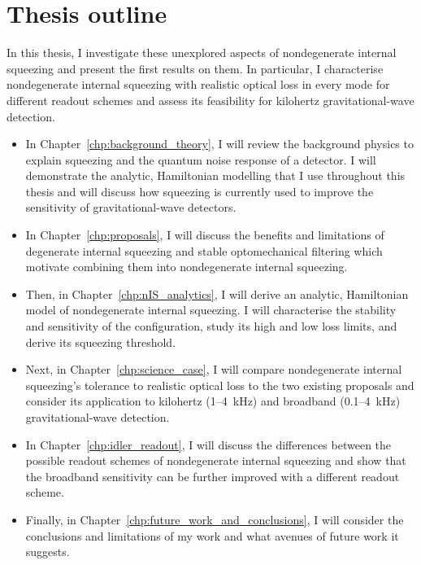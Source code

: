 

\section{Thesis outline}
\label{sec:thesis_outline}


In this thesis, I investigate these unexplored aspects of nondegenerate internal squeezing and present the first results on them. In particular, I characterise nondegenerate internal squeezing with realistic optical loss in every mode for different readout schemes and assess its feasibility for kilohertz gravitational-wave detection.
\begin{itemize}
\itemsep0em 
\item In Chapter~\ref{chp:background_theory}, I will review the background physics to explain squeezing and the quantum noise response of a detector. I will demonstrate the analytic, Hamiltonian modelling that I use throughout this thesis and will discuss how squeezing is currently used to improve the sensitivity of gravitational-wave detectors. %
\item In Chapter~\ref{chp:proposals}, I will discuss the benefits and limitations of degenerate internal squeezing and stable optomechanical filtering which motivate combining them into nondegenerate internal squeezing.
\item Then, in Chapter~\ref{chp:nIS_analytics}, I will derive an analytic, Hamiltonian model of nondegenerate internal squeezing. I will characterise the stability and sensitivity of the configuration, study its high and low loss limits, and derive its squeezing threshold. %
\item Next, in Chapter~\ref{chp:science_case}, I will compare nondegenerate internal squeezing's tolerance to realistic optical loss to the two existing proposals and consider its application to kilohertz (1--4~kHz) and broadband (0.1--4~kHz) gravitational-wave detection.
\item In Chapter~\ref{chp:idler_readout}, I will discuss the differences between the possible readout schemes of nondegenerate internal squeezing and show that the broadband sensitivity can be further improved with a different readout scheme. %
\item Finally, in Chapter~\ref{chp:future_work_and_conclusions}, I will consider the conclusions and limitations of my work and what avenues of future work it suggests.
\end{itemize}

